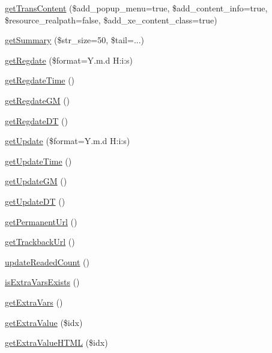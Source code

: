 \begin{DoxyCompactItemize}
\item 
\hyperlink{classdocumentItem_a3143f575cb788ed2317b5697768a6a6f}{get\+Trans\+Content} (\$add\+\_\+popup\+\_\+menu=true, \$add\+\_\+content\+\_\+info=true, \$resource\+\_\+realpath=false, \$add\+\_\+xe\+\_\+content\+\_\+class=true)
\item 
\hyperlink{classdocumentItem_a3c14c5f51f4784b92b78d58f8240f75f}{get\+Summary} (\$str\+\_\+size=50, \$tail=\textquotesingle{}...\textquotesingle{})
\item 
\hyperlink{classdocumentItem_a7284bdd7b3fc87941585790f4a1376d7}{get\+Regdate} (\$format=\textquotesingle{}Y.\+m.\+d H\+:i\+:s\textquotesingle{})
\item 
\hyperlink{classdocumentItem_ac5d8db0250cc8f448d9a76aaa3afa953}{get\+Regdate\+Time} ()
\item 
\hyperlink{classdocumentItem_a7bd6f9adea145314a87c95b13f6e0bd7}{get\+Regdate\+GM} ()
\item 
\hyperlink{classdocumentItem_a30f4ec669361717a82e5dee9c9b3868f}{get\+Regdate\+DT} ()
\item 
\hyperlink{classdocumentItem_ae9c92871b66c8f9d93140775d90b88d1}{get\+Update} (\$format=\textquotesingle{}Y.\+m.\+d H\+:i\+:s\textquotesingle{})
\item 
\hyperlink{classdocumentItem_a026c6426bea71f9ab86a4f4a7dcff6d9}{get\+Update\+Time} ()
\item 
\hyperlink{classdocumentItem_a6bb6ee1c20e63af811ebd2c6993e898f}{get\+Update\+GM} ()
\item 
\hyperlink{classdocumentItem_a05139ae1f3934a4db14e4d73b504f534}{get\+Update\+DT} ()
\item 
\hyperlink{classdocumentItem_a8583e18888f4ad634ec23c7cd85dc172}{get\+Permanent\+Url} ()
\item 
\hyperlink{classdocumentItem_a38db599ef3ca4f789475d7e8cceb13da}{get\+Trackback\+Url} ()
\item 
\hyperlink{classdocumentItem_ac268c88d87f12155e5885510213028e3}{update\+Readed\+Count} ()
\item 
\hyperlink{classdocumentItem_ac51058096d79221c90595564e3dbdb82}{is\+Extra\+Vars\+Exists} ()
\item 
\hyperlink{classdocumentItem_afe41c70dfb21cc8b8d397a3af24eb895}{get\+Extra\+Vars} ()
\item 
\hyperlink{classdocumentItem_a5b0cd52819bcb058a7e8a6764aef79d1}{get\+Extra\+Value} (\$idx)
\item 
\hyperlink{classdocumentItem_a0100c3b24a5c4b75b0edc1bfd139e77a}{get\+Extra\+Value\+H\+T\+ML} (\$idx)

\end{DoxyCompactItemize}
